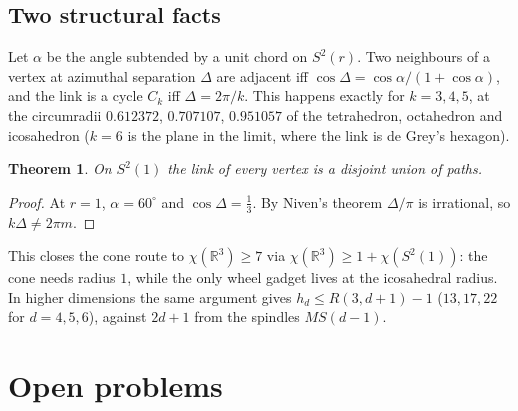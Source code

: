 \documentclass[11pt,a4paper]{amsart}
\newtheorem{theorem}{Theorem}[section]
\theoremstyle{remark}
\newcommand{\R}{\mathbb{R}}
\begin{document}
\subsection{Two structural facts}
Let $\alpha$ be the angle subtended by a unit chord on $S^2(r)$. Two neighbours of a vertex at azimuthal separation $\Delta$ are adjacent iff $\cos\Delta=\cos\alpha/(1+\cos\alpha)$, and the link is a cycle $C_k$ iff $\Delta=2\pi/k$. This happens exactly for $k=3,4,5$, at the circumradii $0.612372$, $0.707107$, $0.951057$ of the tetrahedron, octahedron and icosahedron ($k=6$ is the plane in the limit, where the link is de Grey's hexagon).

\begin{theorem}\label{thm:nocycle}
On $S^2(1)$ the link of every vertex is a disjoint union of paths.
\end{theorem}
\begin{proof}
At $r=1$, $\alpha=60^\circ$ and $\cos\Delta=\tfrac13$. By Niven's theorem $\Delta/\pi$ is irrational, so $k\Delta\ne2\pi m$.
\end{proof}

This closes the cone route to $\chi(\R^3)\ge7$ via $\chi(\R^3)\ge1+\chi(S^2(1))$: the cone needs radius $1$, while the only wheel gadget lives at the icosahedral radius. In higher dimensions the same argument gives $h_d\le R(3,d+1)-1$ ($13,17,22$ for $d=4,5,6$), against $2d+1$ from the spindles $MS(d-1)$.

\section{Open problems}\label{sec:open}
\end{document}
